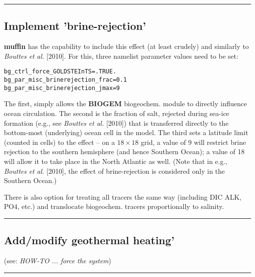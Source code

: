 \noindent\rule{4cm}{0.5pt}

%
\newpage
\subsection*{Implement 'brine-rejection'}
\vspace{1mm}

\textbf{muffin} has the capability to include this effect (at least crudely) and similarly to \textit{Bouttes et al.} [2010]. For this, three namelist parameter values need to be set:

\vspace{-2mm}\begin{verbatim}
bg_ctrl_force_GOLDSTEInTS=.TRUE.
bg_par_misc_brinerejection_frac=0.1
bg_par_misc_brinerejection_jmax=9
\end{verbatim}\vspace{-2mm}
The first, simply allows the \textbf{BIOGEM} biogeochem. module to directly influence ocean circulation. The second is the fraction of salt, rejected during sea-ice formation (e.g., see \textit{Bouttes et al.} [2010]) that is transferred directly to the bottom-most (underlying) ocean cell in the model. The third sets a latitude limit (counted in cells) to the effect -- on a \(18\times18\) grid, a value of 9 will restrict brine rejection to the southern hemisphere (and hence Southern Ocean); a value of 18 will allow it to take  place in the North Atlantic as well. (Note that in e.g., \textit{Bouttes et al.} [2010], the effect of brine-rejection is considered only in the Southern Ocean.)

There is also option for treating all tracers the same way (including DIC ALK, PO4, etc.) and translocate biogeochem. tracers proportionally to salinity.

\noindent\rule{4cm}{0.5pt}

%
\newpage
\subsection*{Add/modify geothermal heating'}
\vspace{1mm}

(see: \textit{HOW-TO ... force the system})

\noindent\rule{4cm}{0.5pt}


\newpage

